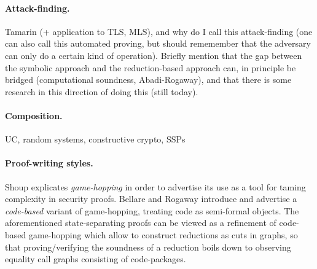 {\color{blue}
\paragraph{Attack-finding.} Tamarin (+ application to TLS, MLS), and why do I call this attack-finding (one can also call this automated proving, but should rememember that the adversary can only do a certain kind of operation). Briefly mention that the gap between the symbolic approach and the reduction-based approach can, in principle be bridged (computational soundness, Abadi-Rogaway), and that there is some research in this direction of doing this (still today).

\paragraph{Composition.} UC, random systems, constructive crypto, SSPs}

\paragraph{Proof-writing styles.}
Shoup explicates \emph{game-hopping} in order to advertise its use as a tool for taming complexity in security proofs. 
Bellare and Rogaway introduce and advertise a \emph{code-based} variant of
game-hopping, treating code as semi-formal objects. 
The aforementioned state-separating proofs can be viewed as a refinement of code-based game-hopping which allow to construct reductions as cuts in graphs, so that proving/verifying the soundness of a reduction boils down to observing equality call graphs consisting of code-packages.

